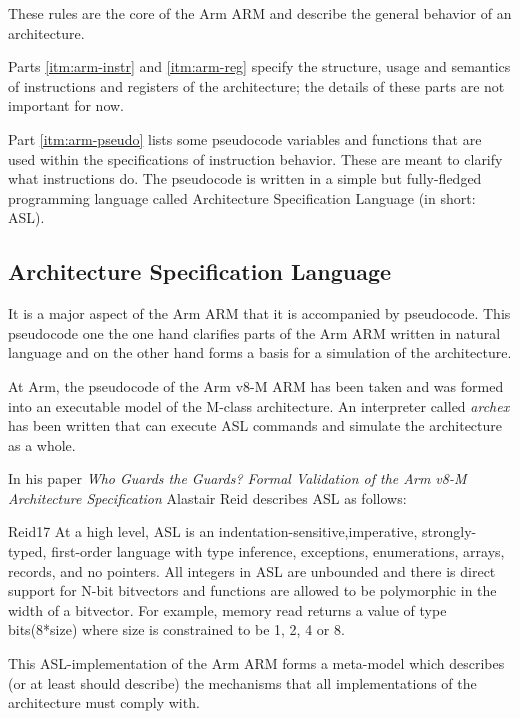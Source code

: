 \documentclass{securem}
\begin{document}
These rules are the core of the Arm ARM and describe the general behavior of an architecture.

Parts \ref{itm:arm-instr} and \ref{itm:arm-reg} specify the structure, usage and semantics of instructions and registers of the architecture; the details of these parts are not important for now.

Part \ref{itm:arm-pseudo} lists some pseudocode variables and functions that are used within the specifications of instruction behavior.
These are meant to clarify what instructions do.
The pseudocode is written in a simple but fully-fledged programming language called Architecture Specification Language (in short: ASL).

\subsection{Architecture Specification Language}

It is a major aspect of the Arm ARM that it is accompanied by pseudocode.
This pseudocode one the one hand clarifies parts of the Arm ARM written in natural language and on the other hand forms a basis for a simulation of the architecture.

At Arm, the pseudocode of the Arm v8-M ARM has been taken and was formed into an executable model of the M-class architecture.
An interpreter called \textit{archex} has been written that can execute ASL commands and simulate the architecture as a whole.

In his paper \textit{Who Guards the Guards? Formal Validation of the Arm v8-M Architecture Specification} Alastair Reid describes ASL as follows:

\begin{displaycquote}{Reid17}
    At a high level, ASL is an indentation-sensitive,imperative, strongly-typed, first-order language with type inference, exceptions, enumerations, arrays, records, and no pointers.
    All integers in ASL are unbounded and there is direct support for N-bit bitvectors and functions are allowed to be polymorphic in the width of a bitvector.
    For example, memory read returns a value of type bits(8*size) where size is constrained to be 1, 2, 4 or 8.
\end{displaycquote}

This ASL-implementation of the Arm ARM forms a meta-model which describes (or at least should describe) the mechanisms that all implementations of the architecture must comply with.
\end{document}

